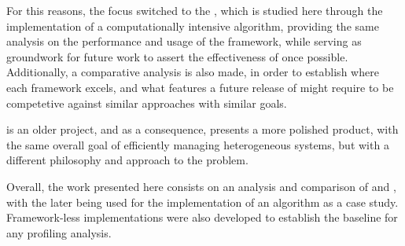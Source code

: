 \documentclass[main.tex]{subfiles}
\begin{document}
 For this reasons, the focus switched to the \starpu, which is studied here through the implementation of a computationally intensive algorithm, providing the same analysis on the performance and usage of the framework, while serving as groundwork for future work to assert the effectiveness of \gama once possible. Additionally, a comparative analysis is also made, in order to establish where each framework excels, and what features a future release of \gama might require to be competetive against similar approaches with similar goals.

\starpu is an older project, and as a consequence, presents a more polished product, with the same overall goal of efficiently managing heterogeneous systems, but with a different philosophy and approach to the problem.

Overall, the work presented here consists on an analysis and comparison of \gama and \starpu, with the later being used for the implementation of an algorithm as a case study. Framework-less implementations were also developed to establish the baseline for any profiling analysis.
\end{document}
